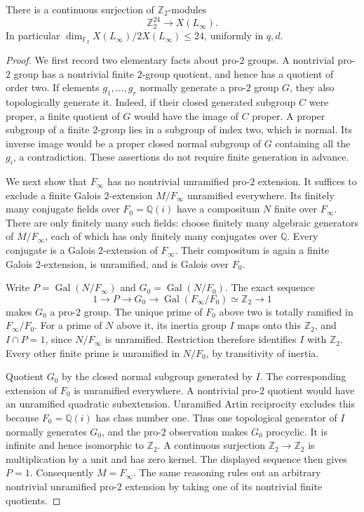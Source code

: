\begin{srproposition}\label{prop:sr-dyadic-generators}
There is a continuous surjection of \(\mathbb Z_2\)-modules
\[
                  \mathbb Z_2^{24}\longrightarrow X(L_\infty).
\]
In particular \(\dim_{\mathbb F_2}X(L_\infty)/2X(L_\infty)\leq24\),
uniformly in \(q,d\).
\end{srproposition}
\begin{proof}
We first record two elementary facts about pro-\(2\) groups.
A nontrivial pro-\(2\) group has a nontrivial finite \(2\)-group
quotient, and hence has a quotient of order two.
If elements \(g_1,\ldots,g_r\) normally generate a pro-\(2\) group
\(G\), they also topologically generate it.
Indeed, if their closed generated subgroup \(C\) were proper, a
finite quotient of \(G\) would have the image of \(C\) proper.
A proper subgroup of a finite \(2\)-group lies in a subgroup of
index two, which is normal. Its inverse image would be a proper
closed normal subgroup of \(G\) containing all the \(g_i\),
a contradiction. These assertions do not require finite generation
in advance.

We next show that \(F_\infty\) has no nontrivial unramified pro-\(2\)
extension. It suffices to exclude a finite Galois \(2\)-extension
\(M/F_\infty\) unramified everywhere.
Its finitely many conjugate fields over \(F_0=\mathbb Q(i)\) have
a compositum \(N\) finite over \(F_\infty\).
There are only finitely many such fields: choose finitely many
algebraic generators of \(M/F_\infty\), each of which has only
finitely many conjugates over \(\mathbb Q\).
Every conjugate is a Galois \(2\)-extension of \(F_\infty\).
Their compositum is again a finite Galois \(2\)-extension, is
unramified, and is Galois over \(F_0\).

Write \(P=\operatorname{Gal}(N/F_\infty)\) and
\(G_0=\operatorname{Gal}(N/F_0)\).
The exact sequence
\[
 1\longrightarrow P\longrightarrow G_0
 \longrightarrow\operatorname{Gal}(F_\infty/F_0)
                         \simeq\mathbb Z_2\longrightarrow1
\]
makes \(G_0\) a pro-\(2\) group.
The unique prime of \(F_0\) above two is totally ramified in
\(F_\infty/F_0\). For a prime of \(N\) above it, its inertia group
\(I\) maps onto this \(\mathbb Z_2\), and
\(I\cap P=1\), since \(N/F_\infty\) is unramified.
Restriction therefore identifies \(I\) with \(\mathbb Z_2\).
Every other finite prime is unramified in \(N/F_0\), by transitivity
of inertia.

Quotient \(G_0\) by the closed normal subgroup generated by \(I\).
The corresponding extension of \(F_0\) is unramified everywhere.
A nontrivial pro-\(2\) quotient would have an unramified quadratic
subextension. Unramified Artin reciprocity excludes this because
\(F_0=\mathbb Q(i)\) has class number one.
Thus one topological generator of \(I\) normally generates \(G_0\),
and the pro-\(2\) observation makes \(G_0\) procyclic.
It is infinite and hence isomorphic to \(\mathbb Z_2\).
A continuous surjection \(\mathbb Z_2\to\mathbb Z_2\) is multiplication
by a unit and has zero kernel. The displayed sequence then gives
\(P=1\). Consequently \(M=F_\infty\).
The same reasoning rules out an arbitrary nontrivial unramified
pro-\(2\) extension by taking one of its nontrivial finite quotients.


\end{proof}
